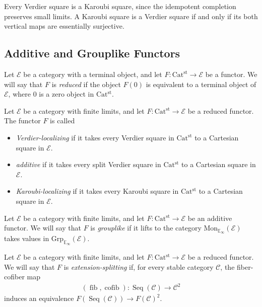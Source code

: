 \documentclass[a4paper,dvipdfmx,11pt,reqno]{amsart}
\DeclareMathOperator{\fib}{fib}
\DeclareMathOperator{\cofib}{cofib}
\DeclareMathOperator{\Seq}{Seq}
\newcommand{\C}{\mathcal{C}}
\newcommand{\E}{\mathcal{E}}
\newcommand{\Catst}{\mathrm{Cat^{st}}}
\newcommand{\Mon}{\mathrm{Mon}_{\mathbb{E}_{\infty}}}
\newcommand{\Grp}{\mathrm{Grp}_{\mathbb{E}_{\infty}}}
\begin{document}
\begin{remark} %
  Every Verdier square is a Karoubi square, since the idempotent completion preserves small limits.
  A Karoubi square is a Verdier square if and only if its both vertical maps are essentially surjective.
\end{remark}

\subsection{Additive and Grouplike Functors}

\begin{definition}
  Let $\E$ be a category with a terminal object, and let $F : \Catst \to \E$ be a functor.
  We will say that $F$ is \textit{reduced} if the object $F(0)$ is equivalent to a terminal object of $\E$, where $0$ is a zero object in $\Catst$.
\end{definition}

\begin{definition}
  Let $\E$ be a category with finite limits, and let $F : \Catst \to \E$ be a reduced functor.
  The functor $F$ is called 
  \begin{itemize}
    \item \textit{Verdier-localizing} if it takes every Verdier square in $\Catst$ to a Cartesian square in $\E$.
    \item \textit{additive} if it takes every split Verdier square in $\Catst$ to a Cartesian square in $\E$.
    \item \textit{Karoubi-localizing} if it takes every Karoubi square in $\Catst$ to a Cartesian square in $\E$.
  \end{itemize}
\end{definition}

\begin{definition}
  Let $\E$ be a category with finite limits, and let $F : \Catst \to \E$ be an additive functor.
  We will say that $F$ is \textit{grouplike} if it lifts to the category $\Mon(\E)$ takes values in $\Grp(\E)$.
\end{definition}

\begin{definition}
  Let $\E$ be a category with finite limits, and let $F : \Catst \to \E$ be a reduced functor.
  We will say that $F$ is \textit{extension-splitting} if, for every stable category $\C$, the fiber-cofiber map
  \begin{align*}
    (\fib,\cofib) : \Seq(\C) \to \C^2
  \end{align*}
  induces an equivalence $F(\Seq(\C)) \to F(\C)^2$.
\end{definition}
\end{document}
